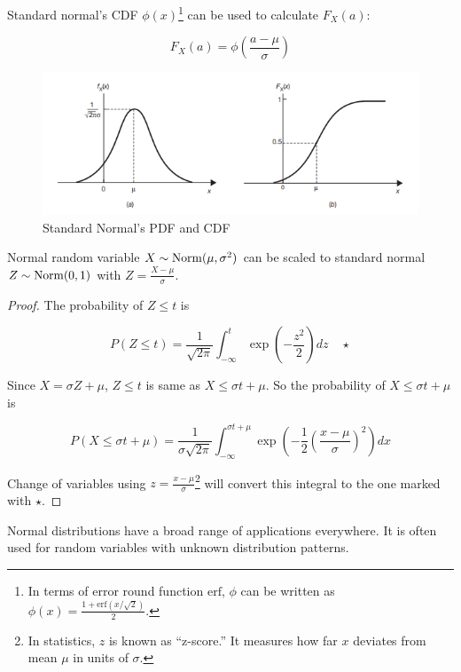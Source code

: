 Standard normal's CDF $\phi(x)$\footnote{In terms of error round function $\text{erf}$, $\phi$ can be written as $\phi(x)=\frac{1+\text{erf}(x/\sqrt{2})}{2}$.} can be used to calculate $F_X(a)$:

$$F_X(a)=\phi\left( \frac{a-\mu}{\sigma} \right)$$

\begin{figure}[H]
	\centering
	\includegraphics[width=120mm]{17.png}
	\caption{Standard Normal's PDF and CDF}
\end{figure}

Normal random variable $X\sim \operatorname{Norm}(\mu,\sigma^2)$ can be scaled to standard normal $Z\sim \operatorname{Norm}(0,1)$ with $Z=\frac{X-\mu}{\sigma}$.

\begin{proof}
	The probability of $Z\le t$ is
	
	$$P(Z\le t)=\frac{1}{\sqrt{2\pi}}\int_{-\infty}^t \exp\left(-\frac{z^2}{2}\right) dz \quad\star$$
	
	Since $X=\sigma Z+\mu$, $Z\le t$ is same as $X\le \sigma t+\mu$. So the probability of $X\le \sigma t+\mu$ is
	
	$$P(X\le \sigma t+\mu)=\frac{1}{\sigma\sqrt{2\pi}} \int_{-\infty}^{\sigma t+\mu} \exp\left(-\frac12 \left( \frac{x-\mu}{\sigma} \right)^2\right) dx$$
	
	Change of variables using $z=\frac{x-\mu}{\sigma}$\footnote{In statistics, $z$ is known as ``z-score.'' It measures how far $x$ deviates from mean $\mu$ in units of $\sigma$.} will convert this integral to the one marked with $\star$.
\end{proof}

Normal distributions have a broad range of applications everywhere. It is often used for random variables with unknown distribution patterns.

